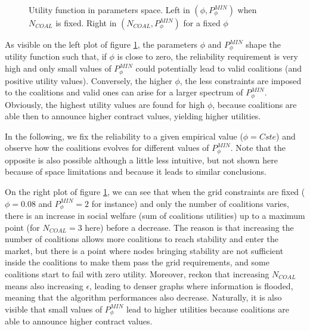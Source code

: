 \documentclass[conference]{IEEEtran}
\begin{document}
\begin{center}
\begin{figure}
\begin{tabular}{cc}
\end{tabular}
\caption{Utility function in parameters space. Left in $ (\phi, P_{\phi}^{MIN}) $ when $ N_{COAL} $ is fixed. Right in $ (N_{COAL}, P_{\phi}^{MIN}) $ for a fixed $ \phi $}
\label{Fig2}
\end{figure}
\end{center}

As visible on the left plot of figure \ref{Fig2}, the parameters $\phi$ and $P_{\phi}^{MIN}$ shape the utility function such that, if $ \phi $ is close to zero, the reliability requirement is very high and only small values of $ P_{\phi}^{MIN}$ could potentially lead to valid coalitions (and positive utility values). Conversely, the higher $\phi$, the less constraints are imposed to the coalitions and valid ones can arise for a larger spectrum of $ P_{\phi}^{MIN}$. Obviously, the highest utility values are found for high $ \phi $, because coalitions are able then to announce higher contract values, yielding higher utilities. 

In the following, we fix the reliability to a given empirical value ($\phi = Cste $) and observe how the coalitions evolves for different values of $P_{\phi}^{MIN}$. Note that the opposite is also possible although a little less intuitive, but not shown here because of space limitations and because it leads to similar conclusions. 

On the right plot of figure \ref{Fig2}, we can see that when the grid constraints are fixed ($ \phi = 0.08 $ and $ P_{\phi}^{MIN} = 2 $ for instance) and only the number of coalitions varies, there is an increase in social welfare (sum of coalitions utilities) up to a maximum point (for $ N_{COAL} = 3 $ here) before a decrease. The reason is that increasing the number of coalitions allows more coalitions to reach stability and enter the market, but there is a point where nodes bringing stability are not sufficient inside the coalitions to make them pass the grid requirements, and some coalitions start to fail with zero utility. Moreover, reckon that increasing $ N_{COAL} $ means also increasing $ \epsilon $, leading to denser graphs where information is flooded, meaning that the algorithm performances also decrease.
Naturally, it is also visible that small values of $P_{\phi}^{MIN}$ lead to higher utilities because coalitions are able to announce higher contract values.
\end{document}
